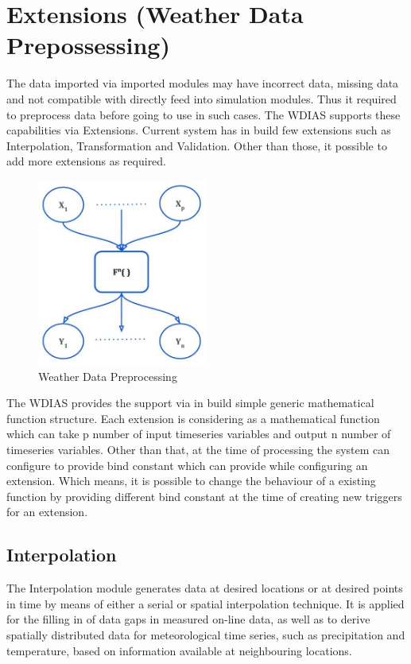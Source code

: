 \section{Extensions (Weather Data Prepossessing)}
The data imported via imported modules may have incorrect data, missing data and not compatible with directly feed into simulation modules. 
Thus it required to preprocess data before going to use in such cases. The WDIAS supports these capabilities via Extensions. Current system has
in build few extensions such as Interpolation, Transformation and Validation. Other than those, it possible to add more extensions as required.
\begin{figure}[htp]
    \centering
    \includegraphics[width=0.5\textwidth]{method/data_preprocess/weather_data_preprocessing.jpg}
    \caption{Weather Data Preprocessing}
    \label{fig:weather_data_preprocessing}
\end{figure}
The WDIAS provides the support via in build simple generic mathematical function structure. Each extension is considering as a mathematical function which can take p 
number of input timeseries variables and output n number of timeseries variables. Other than that, at the time of processing the system can configure to provide
bind constant which can provide while configuring an extension. Which means, it is possible to change the behaviour of a existing function by providing different bind
constant at the time of creating new triggers for an extension.

\subsection{Interpolation}
The Interpolation module generates data at desired locations or at desired points in time by means of either a serial or spatial interpolation technique. It is applied for the filling in of data gaps in measured on-line data, as well as to derive spatially distributed data for meteorological time series, such as precipitation and temperature, based on information available at neighbouring locations.

